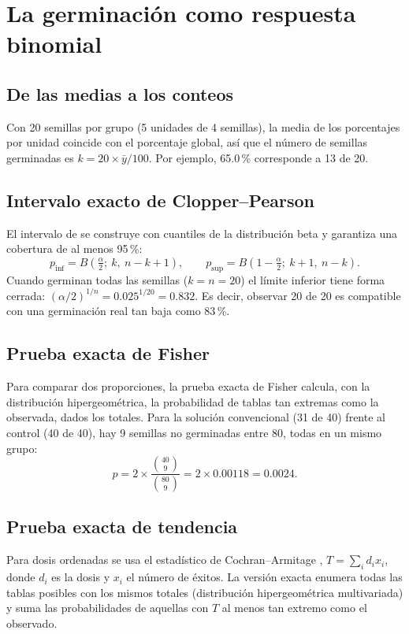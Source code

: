 \documentclass[11pt]{article}
\begin{document}
\section{La germinación como respuesta binomial}\label{sec:germinacion}

\subsection{De las medias a los conteos}

Con 20 semillas por grupo (5 unidades de 4 semillas), la media de los porcentajes por unidad coincide con el porcentaje global, así que el número de semillas germinadas es $k = 20 \times \bar{y}/100$. Por ejemplo, 65.0\,\% corresponde a 13 de 20.

\subsection{Intervalo exacto de Clopper--Pearson}

El intervalo de \citet{clopper} se construye con cuantiles de la distribución beta y garantiza una cobertura de al menos 95\,\%:
\[
p_{\text{inf}} = B\!\left(\tfrac{\alpha}{2};\ k,\ n - k + 1\right), \qquad
p_{\text{sup}} = B\!\left(1 - \tfrac{\alpha}{2};\ k + 1,\ n - k\right).
\]
Cuando germinan todas las semillas ($k = n = 20$) el límite inferior tiene forma cerrada: $(\alpha/2)^{1/n} = 0.025^{1/20} = 0.832$. Es decir, observar 20 de 20 es compatible con una germinación real tan baja como 83\,\%.

\subsection{Prueba exacta de Fisher}

Para comparar dos proporciones, la prueba exacta de Fisher calcula, con la distribución hipergeométrica, la probabilidad de tablas tan extremas como la observada, dados los totales. Para la solución convencional (31 de 40) frente al control (40 de 40), hay 9 semillas no germinadas entre 80, todas en un mismo grupo:
\[
p = 2 \times \frac{\binom{40}{9}}{\binom{80}{9}} = 2 \times 0.00118 = 0.0024 .
\]

\subsection{Prueba exacta de tendencia}

Para dosis ordenadas se usa el estadístico de Cochran--Armitage \citep{cochran,armitage}, $T = \sum_i d_i x_i$, donde $d_i$ es la dosis y $x_i$ el número de éxitos. La versión exacta enumera todas las tablas posibles con los mismos totales (distribución hipergeométrica multivariada) y suma las probabilidades de aquellas con $T$ al menos tan extremo como el observado.
\end{document}

